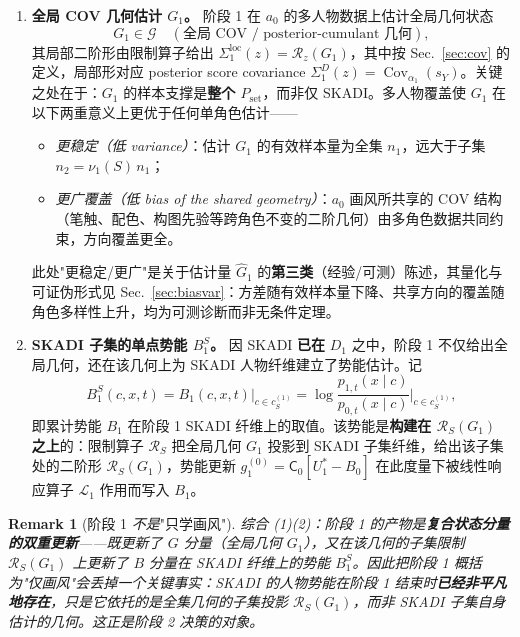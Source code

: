 \documentclass[11pt,a4paper]{article}
\newtheorem{remark}[theorem]{Remark}
\DeclareMathOperator{\Cov}{Cov}
\newcommand{\cL}{\mathcal{L}}   %
\newcommand{\cG}{\mathcal{G}}   %
\newcommand{\Rstr}{\mathcal{R}}     %
\newcommand{\Center}{\mathsf{C}}    %
\begin{document}
\begin{enumerate}[label=\textbf{(\arabic*)},leftmargin=*]

\item \textbf{全局 COV 几何估计 $G_1$。}
阶段 1 在 $a_0$ 的多人物数据上估计全局几何状态
\[
G_1\in\cG\quad(\text{全局 COV / posterior-cumulant 几何}),
\]
其局部二阶形由限制算子给出 $\Sigma_1^{\mathrm{loc}}(z)=\Rstr_z(G_1)$，其中按 Sec.~\ref{sec:cov} 的定义，局部形对应 posterior score covariance $\Sigma_1^D(z)=\Cov_{\alpha_1}(s_Y)$。关键之处在于：$G_1$ 的样本支撑是\textbf{整个 $P_{\mathrm{set}}$}，而非仅 SKADI。多人物覆盖使 $G_1$ 在以下两重意义上更优于任何单角色估计——
\begin{itemize}
\item \emph{更稳定（低 variance）}：估计 $G_1$ 的有效样本量为全集 $n_1$，远大于子集 $n_2=\nu_1(S)\,n_1$；
\item \emph{更广覆盖（低 bias of the shared geometry）}：$a_0$ 画风所共享的 COV 结构（笔触、配色、构图先验等跨角色不变的二阶几何）由多角色数据共同约束，方向覆盖更全。
\end{itemize}
此处"更稳定/更广"是关于估计量 $\widehat G_1$ 的\textbf{第三类}（经验/可测）陈述，其量化与可证伪形式见 Sec.~\ref{sec:biasvar}：方差随有效样本量下降、共享方向的覆盖随角色多样性上升，均为可测诊断而非无条件定理。

\item \textbf{SKADI 子集的单点势能 $B_1^S$。}
因 SKADI \textbf{已在} $D_1$ 之中，阶段 1 不仅给出全局几何，还在该几何上为 SKADI 人物纤维建立了势能估计。记
\[
B_1^S(c,x,t)=B_1(c,x,t)\big|_{c\in c_S^{(1)}}=\log\frac{p_{1,t}(x\mid c)}{p_{0,t}(x\mid c)}\bigg|_{c\in c_S^{(1)}},
\]
即累计势能 $B_1$ 在阶段 1 SKADI 纤维上的取值。该势能是\textbf{构建在 $\Rstr_S(G_1)$ 之上}的：限制算子 $\Rstr_S$ 把全局几何 $G_1$ 投影到 SKADI 子集纤维，给出该子集处的二阶形 $\Rstr_S(G_1)$，势能更新 $g_1^{(0)}=\Center_{0}[U_1^*-B_0]$ 在此度量下被线性响应算子 $\cL_1$ 作用而写入 $B_1$。
\end{enumerate}

\begin{remark}[阶段 1 \emph{不是}"只学画风"]\label{s8:rem-not-only-style}
综合 (1)(2)：阶段 1 的产物是\textbf{复合状态分量的双重更新}——既更新了 $G$ 分量（全局几何 $G_1$），又在该几何的子集限制 $\Rstr_S(G_1)$ 上更新了 $B$ 分量在 SKADI 纤维上的势能 $B_1^S$。因此把阶段 1 概括为"仅画风"会丢掉一个关键事实：SKADI 的人物势能在阶段 1 结束时\textbf{已经非平凡地存在}，只是它依托的是\emph{全集几何的子集投影} $\Rstr_S(G_1)$，而非 SKADI 子集自身估计的几何。这正是阶段 2 决策的对象。
\end{remark}
\end{document}
